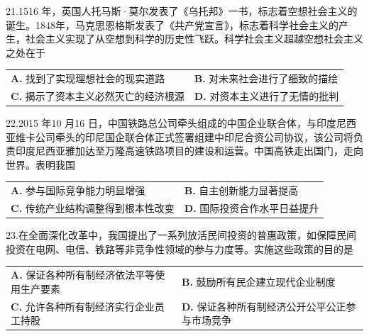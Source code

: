 \documentclass[UTF8,11pt]{ctexart}
\begin{document}
21.1516 年，英国人托马斯·莫尔发表了《乌托邦》一书，标志着空想社会主义的诞生。1848年，马克思恩格斯发表了《共产党宣言》，标志着科学社会主义的产生，社会主义实现了从空想到科学的历史性飞跃。科学社会主义超越空想社会主义之处在于


\begin{center}\begin{tabular}{>{\raggedright\arraybackslash}p{\dimexpr(\linewidth-4\tabcolsep)/2\relax}>{\raggedright\arraybackslash}p{\dimexpr(\linewidth-4\tabcolsep)/2\relax}}
\textbf{A.} 找到了实现理想社会的现实道路 & \textbf{B.} 对未来社会进行了细致的描绘\\[.35em]
\textbf{C.} 揭示了资本主义必然灭亡的经济根源 & \textbf{D.} 对资本主义进行了无情的批判\\[.35em]\end{tabular}\end{center}

22.2015 年10 月16 日，中国铁路总公司牵头组成的中国企业联合体，与印度尼西亚维卡公司牵头的印尼国企联合体正式签署组建中印尼合资公司协议，该公司将负责印度尼西亚雅加达至万隆高速铁路项目的建设和运营。中国高铁走出国门，走向世界。表明我国


\begin{center}\begin{tabular}{>{\raggedright\arraybackslash}p{\dimexpr(\linewidth-4\tabcolsep)/2\relax}>{\raggedright\arraybackslash}p{\dimexpr(\linewidth-4\tabcolsep)/2\relax}}
\textbf{A.} 参与国际竞争能力明显增强 & \textbf{B.} 自主创新能力显著提高\\[.35em]
\textbf{C.} 传统产业结构调整得到根本性改变 & \textbf{D.} 国际投资合作水平日益提升\\[.35em]\end{tabular}\end{center}

23.在全面深化改革中，我国提出了一系列放活民间投资的普惠政策，如保障民间投资在电网、电信、铁路等非竞争性领域的参与力度等。实施这些政策的目的是


\begin{center}\begin{tabular}{>{\raggedright\arraybackslash}p{\dimexpr(\linewidth-4\tabcolsep)/2\relax}>{\raggedright\arraybackslash}p{\dimexpr(\linewidth-4\tabcolsep)/2\relax}}
\textbf{A.} 保证各种所有制经济依法平等使用生产要素 & \textbf{B.} 鼓励所有民企建立现代企业制度\\[.35em]
\textbf{C.} 允许各种所有制经济实行企业员工持股 & \textbf{D.} 保证各种所有制经济公开公平公正参与市场竞争\\[.35em]\end{tabular}\end{center}
\end{document}
